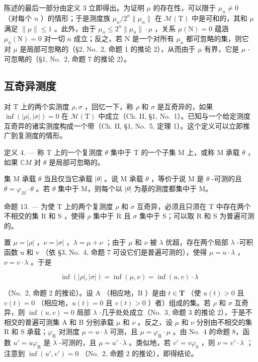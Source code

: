 陈述的最后一部分由定义 3 立即得出。为证明 \(\mu\) 的存在性，可以限于 \(\mu_n \neq 0\) （对每个 \(n\) ）的情形；于是测度族 \(\mu_n / 2^n \| \mu_n \|\) 在 \(\mathcal{M}(\mathrm{T})\) 中是可和的，其和 \(\mu\) 满足 \(\| \mu \| \leqslant 1\) 。此外，由于 \(\mu_n \leqslant 2^n \| \mu_n \| \cdot \mu\) ，关系 \(\mu(\mathrm{N}) = 0\) 蕴涵 \(\mu_n(\mathrm{N}) = 0\) 对一切 \(n\) 成立；反之，若 \(\mathrm{N}\) 是一个对所有 \(\mu_n\) 都可忽略的集，则它对 \(\mu\) 是局部可忽略的（§2, No.~2, 命题 1 的推论 2），从而由于 \(\mu\) 有界，它是 \(\mu\) -可忽略的（§1, No.~2, 命题 7 的推论 2）。

\subsection{互奇异测度}

对 T 上的两个实测度 \(\rho,\sigma\) ，回忆一下，称 \(\rho\) 和 \(\sigma\) 是互奇异的，如果 \(\inf(|\rho|,|\sigma|)=0\) 在 \(\mathcal{M}(\mathrm{T})\) 中成立（Ch. II, §1, No.~1）。已知与一个给定测度互奇异的诸实测度构成一个带（Ch. II, §1, No.~5, 定理 1）。这个定义可以立即推广到复测度的情形。

定义 4. --- 称 T 上的一个复测度 \(\theta\) 集中于 T 的一个子集 M 上，或称 M 承载 \(\theta\) ，如果 \(\mathbb{C}M\) 对 \(\theta\) 是局部可忽略的。

集 M 承载 \(\theta\) 当且仅当它承载 \(|\theta|\) 。说 M 承载 \(\theta\) ，等价于说 M 是 \(\theta\) -可测的且 \(\theta = \varphi_{M} \cdot \theta\) 。若 \(\theta\) 集中于 M，则每个以 \(|\theta|\) 为基的测度都集中于 M。

命题 13. --- 为使 T 上的两个复测度 \(\rho\) 和 \(\sigma\) 互奇异，必须且只须在 T 中存在两个不相交的集 R 和 S ，使得 \(\rho\) 集中于 R 且 \(\sigma\) 集中于 S；可以取 R 和 S 为普遍可测的。

置 \(\mu = |\rho|\) ，\(\nu = |\sigma|\) ，\(\lambda = \mu + \nu\) ；由于 \(\mu\) 和 \(\nu\) 被 \(\lambda\) 优超，存在两个局部 \(\lambda\) -可积函数 u 和 v （依 §3, No.~4, 命题 7 可设它们是普遍可测的），使得 \(\mu = u \cdot \lambda\) ，\(\nu = v \cdot \lambda\) 。于是

\[
\inf (| \rho |, | \sigma |) = \inf (\mu , \nu) = \inf (u, v) \cdot \lambda
\]

（No.~2, 命题 2 的推论）。设 A （相应地，B ）是由 \(t \in \mathbf{T}\) （使 \(u(t) > 0\) 且 \(v(t) = 0\) （相应地，\(u(t) = 0\) 且 \(v(t) > 0\) ）者）组成的集。若 \(\rho\) 和 \(\sigma\) 互奇异，则 \(\inf(u, v) = 0\) 局部 \(\lambda\) -几乎处处成立（No.~3, 命题 3 的推论 2），于是不相交的普遍可测集 A 和 B 分别承载 \(\mu\) 和 \(\nu\) 。反之，设 \(\mu\) 和 \(\nu\) 分别由不相交的集 R 和 S 承载；\(\varphi_{\mathrm{R}}\) 对测度 \(\mu = u \cdot \lambda\) 可测，且 \(\mu = \varphi_{\mathrm{R}} \cdot \mu\) 。由 No.~4 的命题 8，函数 \(u' = u\varphi_{\mathrm{R}}\) 是 \(\lambda\) -可测的，且 \(\mu = u' \cdot \lambda\) 。类似地，若 \(v' = v\varphi_{\mathrm{S}}\) ，则 \(\nu = v' \cdot \lambda\) ；注意到 \(\inf(u', v') = 0\) （No.~2, 命题 2 的推论），即得结论。

